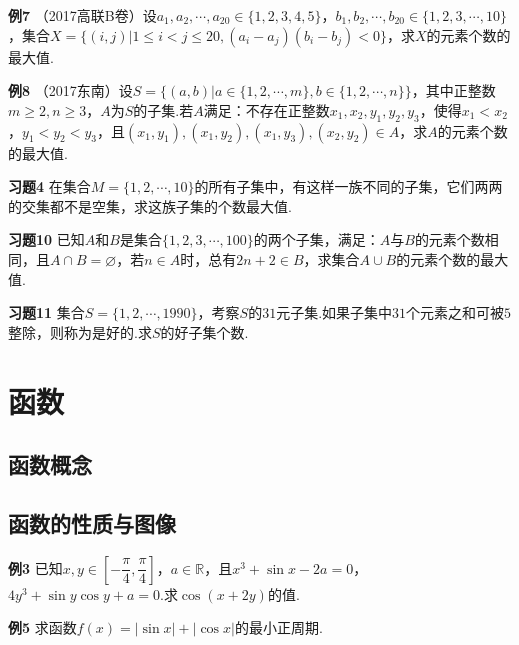 \documentclass[lang=cn, zihao=4.5]{elegantbook}
\begin{document}
\vspace{30em}
\noindent %
	\textbf{例7} \quad （2017高联B卷）设$a_1,a_2, \cdots ,a_{20} \in \{  1,2,3,4,5  \}$，$b_1,b_2, \cdots ,b_{20} \in \{  1,2,3,\cdots ,10  \}$，集合$X=\{  (i,j)|1 \leq i < j \leq 20 , (a_i-a_j)(b_i-b_j)<0  \}$，求$X$的元素个数的最大值.
	
\newpage
\noindent %
	\textbf{例8} \quad （2017东南）设$S=\{  (a,b)|a \in \{ 1,2,\cdots ,m \},b \in \{ 1,2, \cdots ,n \}  \}$，其中正整数$m \geq 2,n \geq 3$，$A$为$S$的子集.若$A$满足：不存在正整数$x_1,x_2,y_1,y_2,y_3$，使得$x_1 < x_2$，$y_1 < y_2 < y_3$，且$(x_1,y_1),(x_1,y_2),(x_1,y_3),(x_2,y_2) \in A$，求$A$的元素个数的最大值.

\vspace{30em}
\noindent %
	\textbf{习题4} \quad 在集合$M = \{  1,2,\cdots ,10  \}$的所有子集中，有这样一族不同的子集，它们两两的交集都不是空集，求这族子集的个数最大值.
	
\newpage
\noindent %
	\textbf{习题10} \quad 已知$A$和$B$是集合$\{  1,2,3, \cdots ,100  \}$的两个子集，满足：$A$与$B$的元素个数相同，且$A \cap B = \varnothing$，若$n \in A$时，总有$2n+2 \in B$，求集合$A \cup B$的元素个数的最大值.

\vspace{30em}
\noindent %
	\textbf{习题11} \quad 集合$S=\{  1,2, \cdots ,1990  \}$，考察$S$的$31$元子集.如果子集中$31$个元素之和可被$5$整除，则称为是好的.求$S$的好子集个数.





\chapter{函数}
\section{函数概念}
\section{函数的性质与图像}

\noindent %
	\textbf{例3} \quad 已知$x,y \in \left[ -\dfrac{\pi}{4},\dfrac{\pi}{4} \right]$，$a \in \mathbb{R}$，且$x^3+\sin x -2a = 0$，$4y^3 + \sin y \cos y + a=0$.求$\cos (x+2y)$的值.
	
\vspace{30em}
\noindent %
	\textbf{例5} \quad 求函数$f(x)=|\sin x|+|\cos x|$的最小正周期.
	
\end{document}
